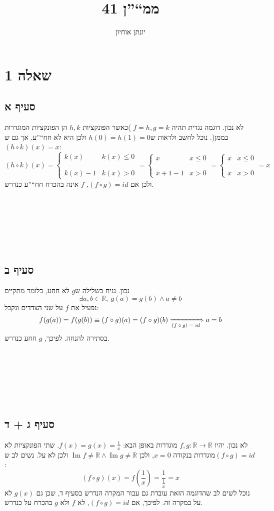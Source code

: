 \documentclass[11pt, oneside]{article}
\title{ממ``''ן 41}
\author{יונתן אוחיון}
\newcommand{\qed}{\R{$\blacksquare$}}
\newcommand{\br}{\\\\\\\\\\\\\\}
\newcommand{\logr}[1]{\xRightarrow[\text{#1}]{}}
\newcommand{\mR}{\mathbb{R}}
\newcommand{\finv}[1]{\frac{1}{#1}}
\DeclareMathOperator{\Ima}{Im}
\begin{document}
\maketitle

\section*{שאלה 1}
\subsection*{סעיף א}
לא נכון. דוגמה נגדית תהיה $f = h, g = k$ )כאשר הפונקציות $h, k$ הן הפונקציות המוגדרות בממן(. נוכל לחשב ולראות ש$h(0) = h(1) = 0$ ולכן היא לא חח``''ע, אך גם ש$(h \circ k)(x) = x$:
\[
(h \circ k)(x)
= \begin{cases}
k(x) & k(x) \le 0\\\\\\
k(x) - 1 & k(x) > 0
\end{cases}
= \begin{cases}
x & x \le 0\\\\\\
x + 1 - 1 & x > 0
\end{cases}
= \begin{cases}
x & x \le 0\\\\\\
x & x > 0
\end{cases} = x
\]
ולכן אם $(f \circ g) = id$, $f$ אינה בהכרח חח``''ע כנדרש.
\br\qed

\subsection*{סעיף ב}
נכון. נניח בשלילה ש$g$ לא חחע, כלומר מתקיים
\[
\exists a, b \in \mR,\ g(a) = g(b) \land a \neq b
\]
נפעיל את $f$ על שני הצדדים ונקבל:
\[
f(g(a)) = f(g(b)) \equiv (f \circ g)(a) = (f \circ g)(b) \logr{$(f \circ g) = id$} a = b
\]
בסתירה להנחה. לפיכך, $g$ חחע כנדרש.
\br\qed

\subsection*{סעיף ג + ד}
לא נכון. יהיו $f, g: \mR \to \mR$ מוגדרות באופן הבא: $f(x) = g(x) = \finv{x}$. שתי הפונקציות לא מוגדרות בנקודה $x = 0$, ולכן $\Ima{f} \neq \mR \land \Ima{g} \neq \mR$ ולכן לא על. נשים לב ש$(f \circ g) = id$:
\[
(f \circ g)(x) = f\left(\finv{x}\right) = \finv{\finv{x}} = x
\]
נוכל לשים לב שהדוגמה הזאת עובדת גם עבור המקרה הנדרש בסעיף ד, שכן גם $g(x)$ לא על במקרה זה. לפיכך, אם $(f \circ g) = id$, לא $f$ ולא $g$ בהכרח על כנדרש.
\br\qed
\clearpage
\end{document}
